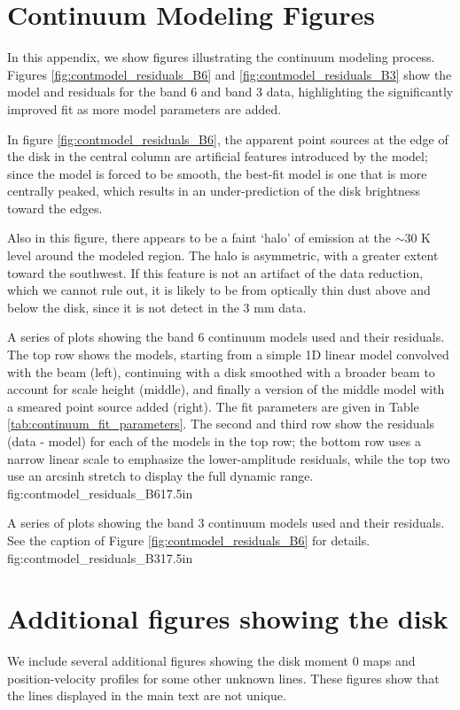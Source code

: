 \documentclass[twocolumn]{aastex61}
\begin{document}
\section{Continuum Modeling Figures}
\label{appendix:contmodel}
In this appendix, we show figures illustrating the continuum modeling process.
Figures \ref{fig:contmodel_residuals_B6} and \ref{fig:contmodel_residuals_B3}
show the model and residuals for the band 6 and band 3 data, highlighting the
significantly improved fit as more model parameters are added.

In figure \ref{fig:contmodel_residuals_B6}, the apparent point sources at the
edge of the disk in the central column are artificial features introduced by
the model; since the model is forced to be smooth, the best-fit model is one
that is more centrally peaked, which results in an under-prediction of the disk
brightness toward the edges.  

Also in this figure, there appears to be a faint `halo' of emission at the
$\sim30$ K level around the modeled region.  The halo is asymmetric, with a
greater extent toward the southwest.  If this feature is not an artifact of the
data reduction, which we cannot rule out, it is likely to be from optically
thin dust above and below the disk, since it is not detect in the 3 mm data.


{A series of plots showing the band 6 continuum models used and their residuals.
The top row shows the models, starting from a simple 1D linear model convolved
with the beam (left), continuing with a disk smoothed with a broader beam to
account for scale height (middle), and finally a version of the middle model
with a smeared point source added (right).  The fit parameters are given in Table
\ref{tab:continuum_fit_parameters}.  The second and third row show the
residuals (data - model) for each of the models in the top row; the bottom row
uses a narrow linear scale to emphasize the lower-amplitude residuals, while
the top two use an arcsinh stretch to display the full dynamic range.
}
{fig:contmodel_residuals_B6}{1}{7.5in}


{A series of plots showing the band 3 continuum models used and their residuals.
See the caption of Figure \ref{fig:contmodel_residuals_B6} for details.
}
{fig:contmodel_residuals_B3}{1}{7.5in}

\section{Additional figures showing the disk}
We include several additional figures showing the disk moment 0 maps and
position-velocity profiles for some other unknown lines.  These figures show
that the lines displayed in the main text are not unique.
\end{document}
